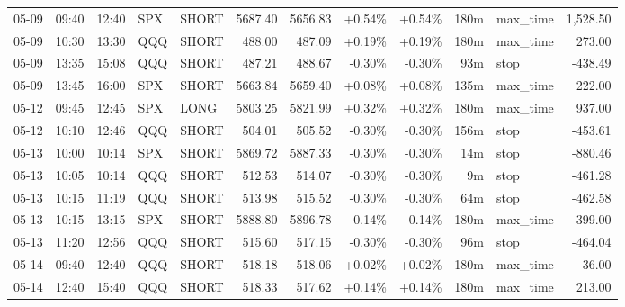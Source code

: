 \documentclass[11pt,a4paper,twoside]{article}
\begin{document}
\begin{center}
\begin{longtable}{>{\color{txtmain}}l l l l l r r r r r >{\color{txtmain}}l r}
05-09 & 09:40 & 12:40 & SPX & SHORT & 5687.40 & 5656.83 & \textcolor{wingreen}{+0.54\%} & \textcolor{wingreen}{+0.54\%} & 180m & max\_time & \textcolor{wingreen}{1,528.50} \\
05-09 & 10:30 & 13:30 & QQQ & SHORT & 488.00 & 487.09 & \textcolor{wingreen}{+0.19\%} & \textcolor{wingreen}{+0.19\%} & 180m & max\_time & \textcolor{wingreen}{273.00} \\
05-09 & 13:35 & 15:08 & QQQ & SHORT & 487.21 & 488.67 & \textcolor{lossred}{-0.30\%} & \textcolor{lossred}{-0.30\%} & 93m & stop & \textcolor{lossred}{-438.49} \\
05-09 & 13:45 & 16:00 & SPX & SHORT & 5663.84 & 5659.40 & \textcolor{wingreen}{+0.08\%} & \textcolor{wingreen}{+0.08\%} & 135m & max\_time & \textcolor{wingreen}{222.00} \\
05-12 & 09:45 & 12:45 & SPX & LONG & 5803.25 & 5821.99 & \textcolor{wingreen}{+0.32\%} & \textcolor{wingreen}{+0.32\%} & 180m & max\_time & \textcolor{wingreen}{937.00} \\
05-12 & 10:10 & 12:46 & QQQ & SHORT & 504.01 & 505.52 & \textcolor{lossred}{-0.30\%} & \textcolor{lossred}{-0.30\%} & 156m & stop & \textcolor{lossred}{-453.61} \\
05-13 & 10:00 & 10:14 & SPX & SHORT & 5869.72 & 5887.33 & \textcolor{lossred}{-0.30\%} & \textcolor{lossred}{-0.30\%} & 14m & stop & \textcolor{lossred}{-880.46} \\
05-13 & 10:05 & 10:14 & QQQ & SHORT & 512.53 & 514.07 & \textcolor{lossred}{-0.30\%} & \textcolor{lossred}{-0.30\%} & 9m & stop & \textcolor{lossred}{-461.28} \\
05-13 & 10:15 & 11:19 & QQQ & SHORT & 513.98 & 515.52 & \textcolor{lossred}{-0.30\%} & \textcolor{lossred}{-0.30\%} & 64m & stop & \textcolor{lossred}{-462.58} \\
05-13 & 10:15 & 13:15 & SPX & SHORT & 5888.80 & 5896.78 & \textcolor{lossred}{-0.14\%} & \textcolor{lossred}{-0.14\%} & 180m & max\_time & \textcolor{lossred}{-399.00} \\
05-13 & 11:20 & 12:56 & QQQ & SHORT & 515.60 & 517.15 & \textcolor{lossred}{-0.30\%} & \textcolor{lossred}{-0.30\%} & 96m & stop & \textcolor{lossred}{-464.04} \\
05-14 & 09:40 & 12:40 & QQQ & SHORT & 518.18 & 518.06 & \textcolor{wingreen}{+0.02\%} & \textcolor{wingreen}{+0.02\%} & 180m & max\_time & \textcolor{wingreen}{36.00} \\
05-14 & 12:40 & 15:40 & QQQ & SHORT & 518.33 & 517.62 & \textcolor{wingreen}{+0.14\%} & \textcolor{wingreen}{+0.14\%} & 180m & max\_time & \textcolor{wingreen}{213.00} \\

\end{longtable}
\end{center}
\end{document}
